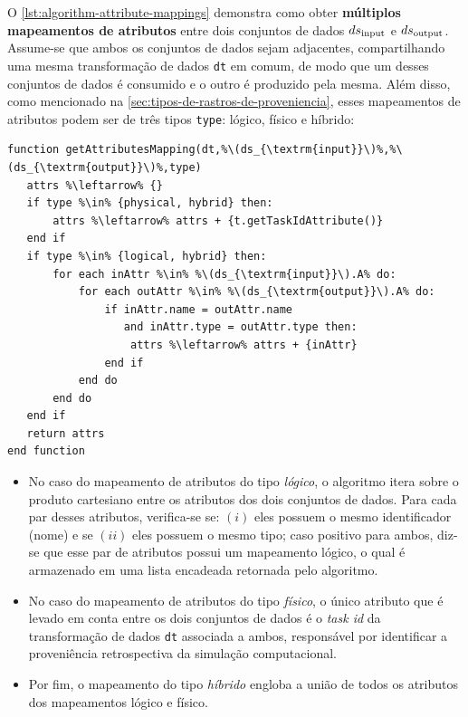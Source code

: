 O \autoref{lst:algorithm-attribute-mappings} demonstra como obter \textbf{múltiplos mapeamentos de atributos} entre dois conjuntos de dados \(ds_{\textup{input}}\) e \(ds_{\textup{output}}\). Assume-se que ambos os conjuntos de dados sejam adjacentes, compartilhando uma mesma transformação de dados \texttt{dt} em comum, de modo que um desses conjuntos de dados é consumido e o outro é produzido pela mesma. Além disso, como mencionado na \autoref{sec:tipos-de-rastros-de-proveniencia}, esses mapeamentos de atributos podem ser de três tipos \texttt{type}: lógico, físico e híbrido:

\begin{minipage}[c]{0.95\textwidth}
\begin{lstlisting}[language=pseudocode,label={lst:algorithm-attribute-mappings},caption={[Obtenção de múltiplos mapeamentos de atributos]Obtenção de múltiplos mapeamentos de atributos entre dois conjuntos de dados adjacentes.}]
function getAttributesMapping(dt,%\(ds_{\textrm{input}}\)%,%\(ds_{\textrm{output}}\)%,type)
   attrs %\leftarrow% {}
   if type %\in% {physical, hybrid} then:
       attrs %\leftarrow% attrs + {t.getTaskIdAttribute()}
   end if
   if type %\in% {logical, hybrid} then:
       for each inAttr %\in% %\(ds_{\textrm{input}}\).A% do:
           for each outAttr %\in% %\(ds_{\textrm{output}}\).A% do:
               if inAttr.name = outAttr.name
                  and inAttr.type = outAttr.type then:
                   attrs %\leftarrow% attrs + {inAttr}
               end if
           end do
       end do
   end if
   return attrs
end function
\end{lstlisting}
\end{minipage}

\begin{itemize}
    \item No caso do mapeamento de atributos do tipo \emph{lógico}, o algoritmo itera sobre o produto cartesiano entre os atributos dos dois conjuntos de dados. Para cada par desses atributos, verifica-se se: \((i)\) eles possuem o mesmo identificador (nome) e se \((ii)\) eles possuem o mesmo tipo; caso positivo para ambos, diz-se que esse par de atributos possui um mapeamento lógico, o qual é armazenado em uma lista encadeada retornada pelo algoritmo.

    \item No caso do mapeamento de atributos do tipo \emph{físico}, o único atributo que é levado em conta entre os dois conjuntos de dados é o \textit{task id} da transformação de dados \texttt{dt} associada a ambos, responsável por identificar a proveniência retrospectiva da simulação computacional.

    \item Por fim, o mapeamento do tipo \emph{híbrido} engloba a união de todos os atributos dos mapeamentos lógico e físico.
\end{itemize}

